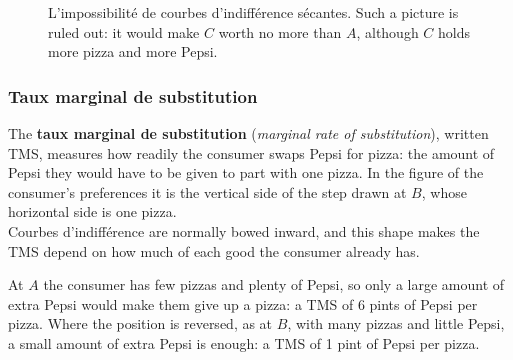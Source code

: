 \begin{figure}[h!]
  \centering
  \caption*{\small L'impossibilité de courbes d'indifférence sécantes. Such a
  picture is ruled out: it would make $C$ worth no more than $A$, although $C$ holds
  more pizza and more Pepsi.}
\end{figure}

\subsubsection{Taux marginal de substitution}

The \textbf{taux marginal de substitution} (\textit{marginal rate of substitution}),
written TMS, measures how readily the consumer swaps Pepsi for pizza: the amount of
Pepsi they would have to be given to part with one pizza. In the figure of the
consumer's preferences it is the vertical side of the step drawn at $B$, whose
horizontal side is one pizza.\\

Courbes d'indifférence are normally bowed inward, and this shape makes the TMS
depend on how much of each good the consumer already has.

\begin{example}
  At $A$ the consumer has few pizzas and plenty of Pepsi, so only a large amount of
  extra Pepsi would make them give up a pizza: a TMS of 6 pints of Pepsi per pizza.
  Where the position is reversed, as at $B$, with many pizzas and little Pepsi, a
  small amount of extra Pepsi is enough: a TMS of 1 pint of Pepsi per pizza.
\end{example}

